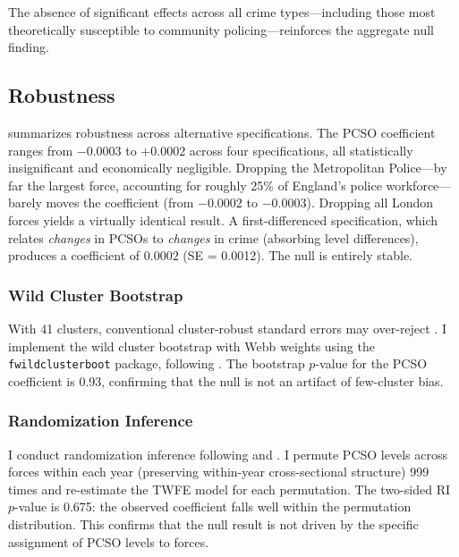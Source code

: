 \documentclass[12pt]{article}
\begin{document}
The absence of significant effects across all crime types---including those most theoretically susceptible to community policing---reinforces the aggregate null finding.

\subsection{Robustness}



 summarizes robustness across alternative specifications. The PCSO coefficient ranges from $-0.0003$ to $+0.0002$ across four specifications, all statistically insignificant and economically negligible. Dropping the Metropolitan Police---by far the largest force, accounting for roughly 25\% of England's police workforce---barely moves the coefficient (from $-0.0002$ to $-0.0003$). Dropping all London forces yields a virtually identical result. A first-differenced specification, which relates \textit{changes} in PCSOs to \textit{changes} in crime (absorbing level differences), produces a coefficient of $0.0002$ (SE = 0.0012). The null is entirely stable.

\subsubsection{Wild Cluster Bootstrap}

With 41 clusters, conventional cluster-robust standard errors may over-reject \citep{cameron2008bootstrap}. I implement the wild cluster bootstrap with Webb weights using the \texttt{fwildclusterboot} package, following \citet{roodman2019fast}. The bootstrap $p$-value for the PCSO coefficient is 0.93, confirming that the null is not an artifact of few-cluster bias.

\subsubsection{Randomization Inference}

I conduct randomization inference following \citet{fisher1935design} and \citet{young2019channeling}. I permute PCSO levels across forces within each year (preserving within-year cross-sectional structure) 999 times and re-estimate the TWFE model for each permutation. The two-sided RI $p$-value is 0.675: the observed coefficient falls well within the permutation distribution. This confirms that the null result is not driven by the specific assignment of PCSO levels to forces.
\end{document}
